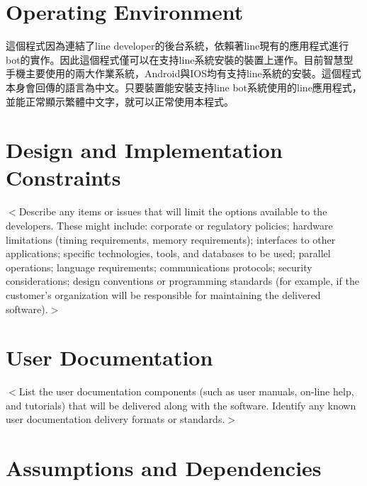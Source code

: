 \documentclass{scrreprt}
\begin{document}
\section{Operating Environment}
\begin{CJK}{UTF8}{<font>}
這個程式因為連結了line developer的後台系統，依賴著line現有的應用程式進行bot的實作。因此這個程式僅可以在支持line系統安裝的裝置上運作。目前智慧型手機主要使用的兩大作業系統，Android與IOS均有支持line系統的安裝。這個程式本身會回傳的語言為中文。只要裝置能安裝支持line bot系統使用的line應用程式，並能正常顯示繁體中文字，就可以正常使用本程式。
\end{CJK}

\section{Design and Implementation Constraints}
\begin{CJK}{UTF8}{<font>}
$<$Describe any items or issues that will limit the options available to the 
developers. These might include: corporate or regulatory policies; hardware 
limitations (timing requirements, memory requirements); interfaces to other 
applications; specific technologies, tools, and databases to be used; parallel 
operations; language requirements; communications protocols; security 
considerations; design conventions or programming standards (for example, if the 
customer’s organization will be responsible for maintaining the delivered 
software).$>$
\end{CJK}

\section{User Documentation}
\begin{CJK}{UTF8}{<font>}
$<$List the user documentation components (such as user manuals, on-line help, 
and tutorials) that will be delivered along with the software. Identify any 
known user documentation delivery formats or standards.$>$
\section{Assumptions and Dependencies}
\end{CJK}
\end{document}
